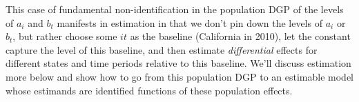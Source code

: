 \documentclass[12pt]{article}
\theoremstyle{plain}
\theoremstyle{definition}
\theoremstyle{remark}
\begin{document}
\begin{itemize}

    This case of fundamental non-identification in the population DGP of
    the levels of $a_i$ and $b_t$ manifests in estimation in that we
    don't pin down the levels of $a_i$ or $b_t$, but rather choose some
    $it$ as the baseline (California in 2010), let the constant capture
    the level of this baseline, and then estimate \emph{differential}
    effects for different states and time periods relative to this
    baseline.
    We'll discuss estimation more below and show how to go from this
    population DGP to an estimable model whose estimands are identified
    functions of these population effects.


\end{itemize}
\end{document}
